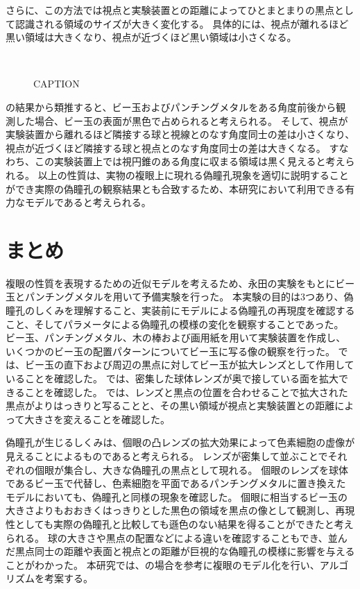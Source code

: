 さらに、この方法では視点と実験装置との距離によってひとまとまりの黒点として認識される領域のサイズが大きく変化する。
具体的には、視点が離れるほど黒い領域は大きくなり、視点が近づくほど黒い領域は小さくなる。
\begin{figure}[htbp]
  \centering
{}
\\
  \caption{CAPTION}
  \label{FExp}
\end{figure}
の結果から類推すると、ビー玉およびパンチングメタルをある角度前後から観測した場合、ビー玉の表面が黒色で占められると考えられる。
そして、視点が実験装置から離れるほど隣接する球と視線とのなす角度同士の差は小さくなり、視点が近づくほど隣接する球と視点とのなす角度同士の差は大きくなる\figref{}。
すなわち、この実験装置上では視円錐のある角度に収まる領域は黒く見えると考えられる\figref{}。
以上の性質は、実物の複眼上に現れる偽瞳孔現象を適切に説明することができ実際の偽瞳孔の観察結果とも合致するため、本研究において利用できる有力なモデルであると考えられる。

\section{まとめ}
\label{SEcperimentTotal}

複眼の性質を表現するための近似モデルを考えるため、永田の実験をもとにビー玉とパンチングメタルを用いて予備実験を行った。
本実験の目的は3つあり、偽瞳孔のしくみを理解すること、実装前にモデルによる偽瞳孔の再現度を確認すること、そしてパラメータによる偽瞳孔の模様の変化を観察することであった。
ビー玉、パンチングメタル、木の棒および画用紙を用いて実験装置を作成し、いくつかのビー玉の配置パターンについてビー玉に写る像の観察を行った。
では、ビー玉の直下および周辺の黒点に対してビー玉が拡大レンズとして作用していることを確認した。
では、密集した球体レンズが奥で接している面を拡大できることを確認した。
では、レンズと黒点の位置を合わせることで拡大された黒点がよりはっきりと写ることと、その黒い領域が視点と実験装置との距離によって大きさを変えることを確認した。

偽瞳孔が生じるしくみは、個眼の凸レンズの拡大効果によって色素細胞の虚像が見えることによるものであると考えられる。
レンズが密集して並ぶことでそれぞれの個眼が集合し、大きな偽瞳孔の黒点として現れる。
個眼のレンズを球体であるビー玉で代替し、色素細胞を平面であるパンチングメタルに置き換えたモデルにおいても、偽瞳孔と同様の現象を確認した。
個眼に相当するビー玉の大きさよりもおおきくはっきりとした黒色の領域を黒点の像として観測し、再現性としても実際の偽瞳孔と比較しても遜色のない結果を得ることができたと考えられる。
球の大きさや黒点の配置などによる違いを確認することもでき、並んだ黒点同士の距離や表面と視点との距離が巨視的な偽瞳孔の模様に影響を与えることがわかった。
本研究では、の場合を参考に複眼のモデル化を行い、アルゴリズムを考案する。
